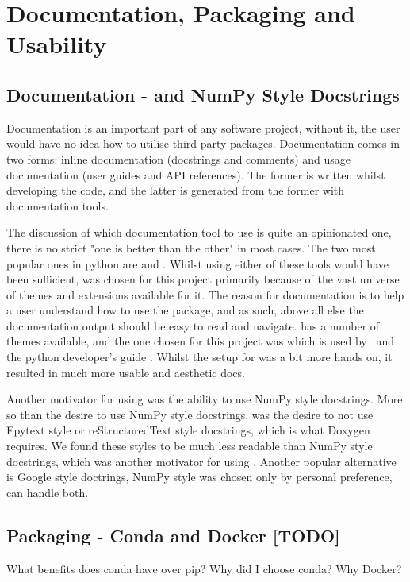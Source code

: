 
\section{Documentation, Packaging and Usability}\label{sec:documentation-packaging-and-usability}
    \subsection{Documentation -  and NumPy Style Docstrings}\label{subsec:documentation-sphinx}
    Documentation is an important part of any software project, without it, the user would have no idea how to utilise
    third-party packages.
    Documentation comes in two forms: inline documentation (docstrings and comments) and usage documentation (user guides
    and API references).
    The former is written whilst developing the code, and the latter is generated from the former with documentation tools.

    The discussion of which documentation tool to use is quite an opinionated one, there is no strict "one is better than
    the other" in most cases.
    The two most popular ones in python are  and .
    Whilst using either of these tools would have been sufficient,  was chosen for this project
    primarily because of the vast universe of themes and extensions available for it.
    The reason for documentation is to help a user understand how to use the package, and as such, above all else
    the documentation output should be easy to read and navigate.
     has a number of themes available, and the one chosen for this project was  which
    is used by  \cite{pip-docs}\,  \cite{black-docs} and the python developer's guide
    \cite{python-devguide}.
    Whilst the setup for  was a bit more hands on, it resulted in much more usable and aesthetic docs.

    Another motivator for using  was the ability to use NumPy style docstrings.
    More so than the desire to use NumPy style docstrings, was the desire to not use Epytext style or reStructuredText style
    docstrings, which is what Doxygen requires.
    We found these styles to be much less readable than NumPy style docstrings, which was another motivator for using
    .
    Another popular alternative is Google style doctrings, NumPy style was chosen only by personal preference, 
    can handle both.

    \subsection{Packaging - Conda and Docker [TODO]}\label{subsec:packaging-pypi}
    What benefits does conda have over pip? Why did I choose conda?
    Why Docker?